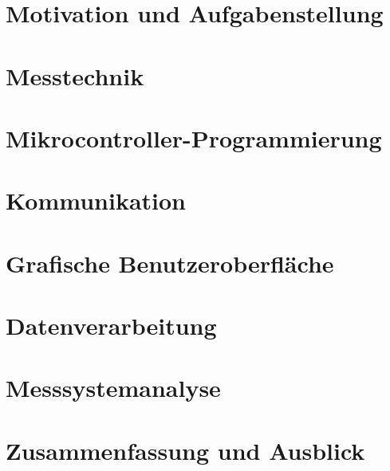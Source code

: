 \documentclass[12pt,a4paper,twoside]{report}
\begin{document}
\chapter{Motivation und Aufgabenstellung}
\setcounter{page}{1}


\chapter{Messtechnik}


\chapter{Mikrocontroller-Programmierung}


\chapter{Kommunikation}


\chapter{Grafische Benutzeroberfläche}


\chapter{Datenverarbeitung}


\chapter{Messsystemanalyse}


\chapter{Zusammenfassung und Ausblick}


\printbibliography

\appendix
\end{document}
